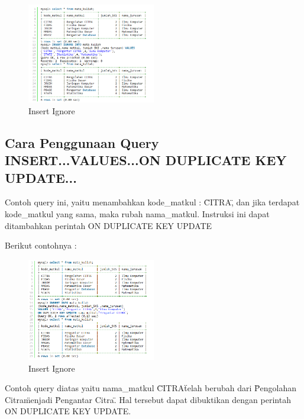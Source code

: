 		\begin{figure}[ht]
			\centerline{\includegraphics[width=0.5\textwidth]{figures/insert7.png}}
			\caption{Insert Ignore}
			\label{insert7}
			\end{figure}
			
	\subsection{Cara Penggunaan Query INSERT...VALUES...ON DUPLICATE KEY UPDATE...}
	Contoh query ini, yaitu menambahkan kode_matkul : \"CITRA\" , dan jika terdapat kode_matkul yang sama, maka rubah nama_matkul. Instruksi ini dapat ditambahkan perintah ON DUPLICATE KEY UPDATE
	
	Berikut contohnya :
	
		\begin{figure}[ht]
			\centerline{\includegraphics[width=0.5\textwidth]{figures/insert8.png}}
			\caption{Insert Ignore}
			\label{insert8}
			\end{figure}
	
	Contoh query diatas yaitu nama_matkul \"CITRA\" telah berubah dari \"Pengolahan Citra\" menjadi \"Pengantar Citra\". Hal tersebut dapat dibuktikan dengan perintah ON DUPLICATE KEY UPDATE.
	
\cite{sofwan2003belajar}
\cite{kadir2010mudah}
